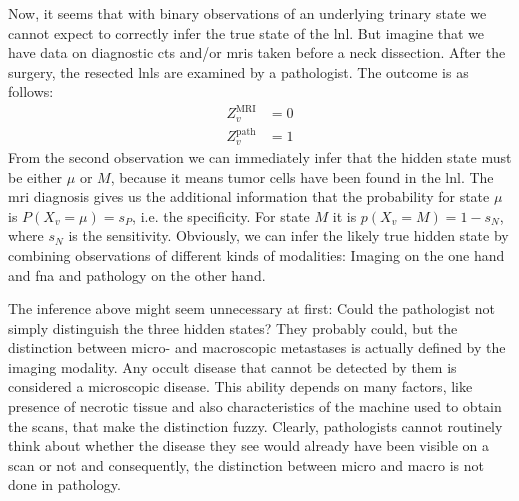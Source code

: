 \documentclass[\relativeRoot/main.tex]{subfiles}
\begin{document}
Now, it seems that with binary observations of an underlying trinary state we cannot expect to correctly infer the true state of the \gls{lnl}. But imagine that we have data on diagnostic \glspl{ct} and/or \glspl{mri} taken before a neck dissection. After the surgery, the resected \glspl{lnl} are examined by a pathologist. The outcome is as follows:
%
\begin{equation}
    \begin{aligned}
        Z_v^\text{MRI} &= 0 \\
        Z_v^\text{path} &= 1
    \end{aligned}
\end{equation}
%
From the second observation we can immediately infer that the hidden state must be either $\mu$ or $M$, because it means tumor cells have been found in the \gls{lnl}. The \gls{mri} diagnosis gives us the additional information that the probability for state $\mu$ is $P(X_v = \mu) = s_P$, i.e. the specificity. For state $M$ it is $p(X_v = M) = 1 - s_N$, where $s_N$ is the sensitivity. Obviously, we can infer the likely true hidden state by combining observations of different kinds of modalities: Imaging on the one hand and \gls{fna} and pathology on the other hand.

The inference above might seem unnecessary at first: Could the pathologist not simply distinguish the three hidden states? They probably could, but the distinction between micro- and macroscopic metastases is actually defined by the imaging modality. Any occult disease that cannot be detected by them is considered a microscopic disease. This ability depends on many factors, like presence of necrotic tissue and also characteristics of the machine used to obtain the scans, that make the distinction fuzzy. Clearly, pathologists cannot routinely think about whether the disease they see would already have been visible on a scan or not and consequently, the distinction between micro and macro is not done in pathology.
\end{document}
